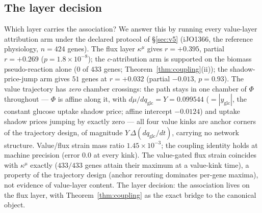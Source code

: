 \documentclass[11pt,a4paper]{article}
\theoremstyle{plain}
\theoremstyle{definition}
\theoremstyle{remark}
\newcommand{\kmu}{\kappa^{\mu}}
\begin{document}
\subsection{The layer decision}
\label{sec:v6}
Which layer carries the association? We answer this by running every
value-layer attribution arm under the declared protocol of \S\ref{sec:v5}
(iJO1366, the reference physiology, $n = 424$ genes). The flux layer
$\kmu$ gives $r = +0.395$,
partial $r = +0.269$ ($p = 1.8 \times 10^{-8}$); the $c$-attribution
arm is supported on the biomass pseudo-reaction alone ($0$ of $433$
genes; Theorem~\ref{thm:coupling}(ii)); the shadow-price-jump arm
gives $51$ genes at $r = +0.032$ (partial $-0.013$, $p = 0.93$). The
value trajectory has \emph{zero} chamber crossings: the path stays in
one chamber of $\Phi$ throughout --- $\Phi$ is affine along it, with
$d\mu/dq_{\mathrm{glc}} = Y = 0.099544$ ($= |y_{\mathrm{glc}}|$, the
constant glucose uptake shadow price; affine intercept $-0.0124$) and
uptake shadow prices jumping by exactly zero --- all four value kinks
are anchor corners of the trajectory design, of magnitude
$Y\,\Delta(dq_{\mathrm{glc}}/dt)$, carrying no network structure. Value/flux strain mass ratio
$1.45 \times 10^{-3}$; the coupling identity holds at machine
precision (error $0.0$ at every kink). The value-gated flux strain
coincides with $\kmu$ exactly ($433/433$ genes attain their maximum
at a value-kink time), a property of the trajectory design (anchor
rerouting dominates per-gene maxima), not evidence of value-layer
content. The layer decision: the association lives on the flux layer,
with Theorem~\ref{thm:coupling} as the exact bridge to the canonical
object.
\end{document}
